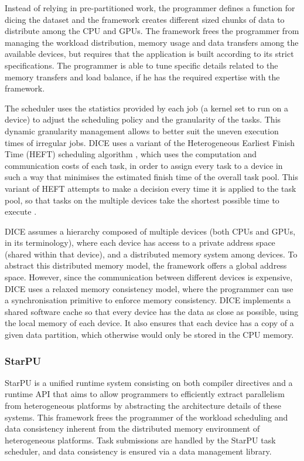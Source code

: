 Instead of relying in pre-partitioned work, the programmer defines a function for dicing the dataset and the framework creates different sized chunks of data to distribute among the CPU and GPUs. The framework frees the programmer from managing the workload distribution, memory usage and data transfers among the available devices, but requires that the application is built according to its strict specifications. The programmer is able to tune specific details related to the memory transfers and load balance, if he has the required expertise with the framework.

The scheduler uses the statistics provided by each job (a kernel set to run on a device) to adjust the scheduling policy and the granularity of the tasks. This dynamic granularity management allows to better suit the uneven execution times of irregular jobs. DICE uses a variant of the Heterogeneous Earliest Finish Time (HEFT) scheduling algorithm \cite{HEFT}, which uses the computation and communication costs of each task, in order to assign every task to a device in such a way that minimises the estimated finish time of the overall task pool. This variant of HEFT attempts to make a decision every time it is applied to the task pool, so that tasks on the multiple devices take the shortest possible time to execute \cite{Msc:Mariano}.

DICE assumes a hierarchy composed of multiple devices (both CPUs and GPUs, in its terminology), where each device has access to a private address space (shared within that device), and a distributed memory system among devices. To abstract this distributed memory model, the framework offers a global address space. However, since the communication between different devices is expensive, DICE uses a relaxed memory consistency model, where the programmer can use a synchronisation primitive to enforce memory consistency. DICE implements a shared software cache so that every device has the data as close as possible, using the local memory of each device. It also ensures that each device has a copy of a given data partition, which otherwise would only be stored in the CPU memory.

\subsubsection*{StarPU}

StarPU \cite{STARPU} is a unified runtime system consisting on both compiler directives and a runtime API that aims to allow programmers to efficiently extract parallelism from heterogeneous platforms by abstracting the architecture details of these systems. This framework frees the programmer of the workload scheduling and data consistency inherent from the distributed memory environment of heterogeneous platforms. Task submissions are handled by the StarPU task scheduler, and data consistency is ensured via a data management library.

